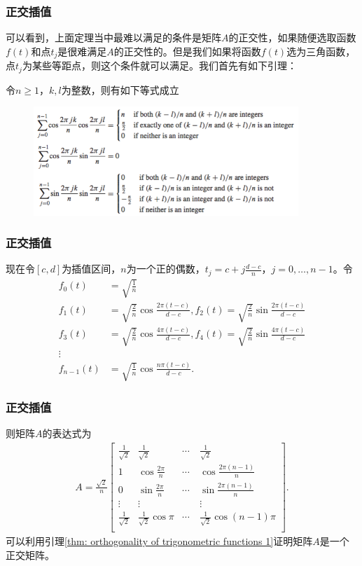 \documentclass[10pt]{beamer}
\begin{document}
\begin{frame}
\frametitle{正交插值}
可以看到，上面定理当中最难以满足的条件是矩阵$A$的正交性，如果随便选取函数$f(t)$和点$t_j$是很难满足$A$的正交性的。但是我们如果将函数$f(t)$选为三角函数，点$t_j$为某些等距点，则这个条件就可以满足。我们首先有如下引理：
\begin{lemma}
\label{thm: orthogonality of trigonometric functions 1}
令$n \ge 1$，$k,l$为整数，则有如下等式成立
\begin{figure}
\includegraphics[width=10cm]{figs/10-3-1_Orthogonal_Interp-1} 
\end{figure}
\end{lemma}
\end{frame}


\begin{frame}
\frametitle{正交插值}
现在令$[c,d]$为插值区间，$n$为一个正的偶数，$t_j = c + j \frac{d-c}{n}$，$j = 0, \ldots, n-1$。令
\begin{align}
f_0(t) &= \sqrt{\frac{1}{n}} \nonumber \\
f_1(t) &= \sqrt{\frac{2}{n}} \cos \frac{2 \pi (t-c)}{d-c}, f_2(t) = \sqrt{\frac{2}{n}} \sin \frac{2 \pi (t-c)}{d-c} \nonumber \\
f_3(t) &= \sqrt{\frac{2}{n}} \cos \frac{4 \pi (t-c)}{d-c}, f_4(t) = \sqrt{\frac{2}{n}} \sin \frac{4 \pi (t-c)}{d-c} \nonumber \\
\vdots \nonumber \\
f_{n-1} (t) &= \sqrt{\frac{1}{n}} \cos \frac{n \pi (t-c)}{d-c}.
\end{align}
\end{frame}


\begin{frame}
\frametitle{正交插值}
则矩阵$A$的表达式为
\begin{align}
A =\frac{\sqrt{2}}{n} \left[ \begin{array}{cccc}
     \frac{1}{\sqrt{2}}    &  \frac{1}{\sqrt{2}}  & \cdots  & \frac{1}{\sqrt{2}}  \\
     1    & \cos \frac{2\pi}{n} & \cdots  & \cos \frac{2\pi (n-1)}{n}  \\
     0    & \sin \frac{2\pi}{n} & \cdots  & \sin \frac{2\pi (n-1)}{n}  \\     
     \vdots       & \vdots   &  \quad  & \vdots  \\
     \frac{1}{\sqrt{2}}   & \frac{1}{\sqrt{2}} \cos \pi &  \cdots  &  \frac{1}{\sqrt{2}} \cos (n-1) \pi  \\                
            \end{array} \right] .
\end{align}
可以利用引理\ref{thm: orthogonality of trigonometric functions 1}证明矩阵$A$是一个正交矩阵。
\end{frame}
\end{document}

